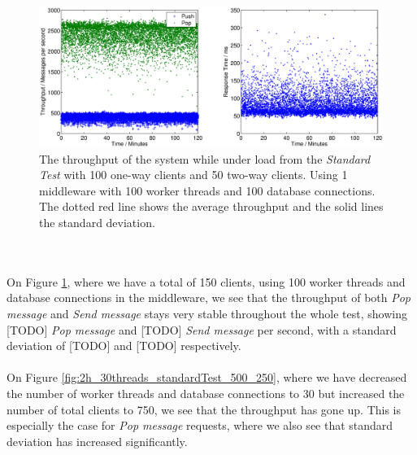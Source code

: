 \documentclass{article}
\begin{document}
            \begin{figure}[H]
                \hspace{-1.5cm}
                \includegraphics[scale=0.750]{2h_100threads_standardTest_100_50}
                \caption{The throughput of the system while under load from the \textit{Standard Test} with 100 one-way clients and 50 two-way clients. Using 1 middleware with 100 worker threads and 100 database connections. The dotted red line shows the average throughput and the solid lines the standard deviation.}
                \label{fig:2h_100threads_standardTest_100_50}
            \end{figure}
            ~\\
            \\
            On Figure \ref{fig:2h_100threads_standardTest_100_50}, where we have a total of 150 clients, using 100 worker threads and database connections in the middleware, we see that the throughput of both \textit{Pop message} and \textit{Send message} stays very stable throughout the whole test, showing [TODO] \textit{Pop message} and [TODO] \textit{Send message} per second, with a standard deviation of [TODO] and [TODO] respectively.\\
            \\
            On Figure \ref{fig:2h_30threads_standardTest_500_250}, where we have decreased the number of worker threads and database connections to 30 but increased the number of total clients to 750, we see that the throughput has gone up. This is especially the case for \textit{Pop message} requests, where we also see that standard deviation has increased significantly.
\end{document}
